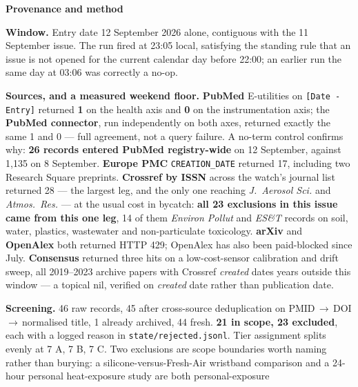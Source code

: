 \documentclass[10pt]{article}
\begin{document}


\vspace{4mm}
\begin{keybox}
{\sffamily\bfseries\footnotesize\color{Deep}Provenance and method}\\[1.2mm]
{\fontsize{7.2}{8.8}\selectfont
\textbf{Window.} Entry date 12 September 2026 alone, contiguous with the 11 September
issue. The run fired at 23:05 local, satisfying the standing rule that an issue is not
opened for the current calendar day before 22:00; an earlier run the same day at 03:06 was
correctly a no-op.\par
\vspace{0.8mm}
\textbf{Sources, and a measured weekend floor.} \textbf{PubMed} E-utilities on
\texttt{[Date - Entry]} returned \textbf{1} on the health axis and \textbf{0} on the
instrumentation axis; the \textbf{PubMed connector}, run independently on both axes,
returned exactly the same 1 and 0 --- full agreement, not a query failure. A no-term control
confirms why: \textbf{26 records entered PubMed registry-wide} on 12 September, against
1{,}135 on 8 September. \textbf{Europe PMC} \texttt{CREATION\_DATE} returned 17, including
two Research Square preprints. \textbf{Crossref by ISSN} across the watch's journal list
returned 28 --- the largest leg, and the only one reaching \textit{J.\ Aerosol Sci.} and
\textit{Atmos.\ Res.} --- at the usual cost in bycatch: \textbf{all 23 exclusions in this
issue came from this one leg}, 14 of them \textit{Environ Pollut} and \textit{ES\&T}
records on soil, water, plastics, wastewater and non-particulate toxicology.
\textbf{arXiv} and \textbf{OpenAlex} both returned HTTP 429; OpenAlex has also been
paid-blocked since July. \textbf{Consensus} returned three hits on a low-cost-sensor
calibration and drift sweep, all 2019--2023 archive papers with Crossref \emph{created}
dates years outside this window --- a topical nil, verified on \emph{created} date rather
than publication date.\par
\vspace{0.8mm}
\textbf{Screening.} 46 raw records, 45 after cross-source deduplication on
PMID\,$\rightarrow$\,DOI\,$\rightarrow$\,normalised title, 1 already archived, 44 fresh.
\textbf{21 in scope, 23 excluded}, each with a logged reason in
\texttt{state/rejected.jsonl}. Tier assignment splits evenly at 7 A, 7 B, 7 C. Two
exclusions are scope boundaries worth naming rather than burying: a silicone-versus-Fresh-Air
wristband comparison and a 24-hour personal heat-exposure study are both personal-exposure
}
\end{keybox}
\end{document}
